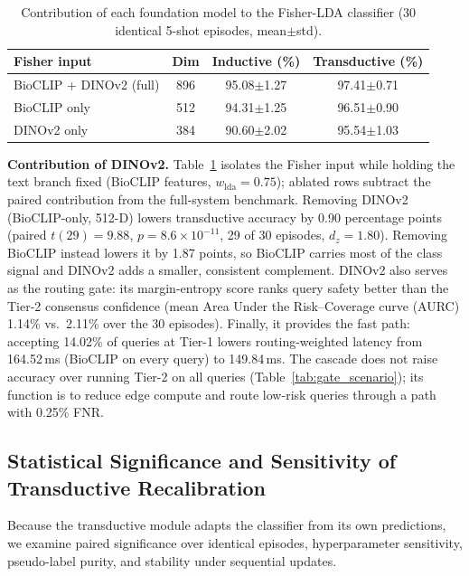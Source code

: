 \documentclass[preprint,12pt]{elsarticle}
\begin{document}
\begin{table}[htbp]
\caption{Contribution of each foundation model to the Fisher-LDA classifier (30 identical 5-shot episodes, mean$\pm$std).}
\label{tab:feature_ablation}
\centering

\footnotesize
\setlength{\tabcolsep}{4pt}
\begin{tabular*}{\columnwidth}{@{\extracolsep{\fill}}lccc}
\toprule
\textbf{Fisher input} & \textbf{Dim} & \textbf{Inductive (\%)} & \textbf{Transductive (\%)} \\
\midrule
BioCLIP + DINOv2 (full) & 896 & 95.08$\pm$1.27 & 97.41$\pm$0.71 \\
BioCLIP only & 512 & 94.31$\pm$1.25 & 96.51$\pm$0.90 \\
DINOv2 only & 384 & 90.60$\pm$2.02 & 95.54$\pm$1.03 \\
\bottomrule
\end{tabular*}
\end{table}

\textbf{Contribution of DINOv2.} Table~\ref{tab:feature_ablation} isolates the Fisher input while holding the text branch fixed (BioCLIP features, $w_{\mathrm{lda}}=0.75$); ablated rows subtract the paired contribution from the full-system benchmark. Removing DINOv2 (BioCLIP-only, 512-D) lowers transductive accuracy by 0.90 percentage points (paired $t(29)=9.88$, $p=8.6\times10^{-11}$, 29 of 30 episodes, $d_z=1.80$). Removing BioCLIP instead lowers it by 1.87 points, so BioCLIP carries most of the class signal and DINOv2 adds a smaller, consistent complement. DINOv2 also serves as the routing gate: its margin-entropy score ranks query safety better than the Tier-2 consensus confidence (mean Area Under the Risk--Coverage curve (AURC) 1.14\% vs.\ 2.11\% over the 30 episodes). Finally, it provides the fast path: accepting 14.02\% of queries at Tier-1 lowers routing-weighted latency from 164.52\,ms (BioCLIP on every query) to 149.84\,ms. The cascade does not raise accuracy over running Tier-2 on all queries (Table~\ref{tab:gate_scenario}); its function is to reduce edge compute and route low-risk queries through a path with 0.25\% FNR.

\subsection{Statistical Significance and Sensitivity of Transductive Recalibration}
\label{sec:transductive_validation}
Because the transductive module adapts the classifier from its own predictions, we examine paired significance over identical episodes, hyperparameter sensitivity, pseudo-label purity, and stability under sequential updates.
\end{document}
